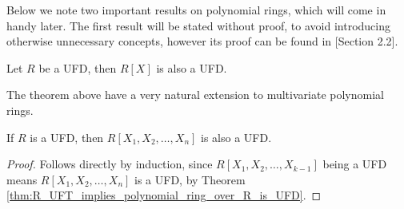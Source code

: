 Below we note two important results on polynomial rings, which will come in handy later. The first result will be stated without proof, to avoid introducing otherwise unnecessary concepts, however its proof can be found in \cite{lang}[Section 2.2].
\begin{theorem}\label{thm:R_UFT_implies_polynomial_ring_over_R_is_UFD}
  Let $R$ be a UFD, then $R[X]$ is also a UFD.
\end{theorem}

The theorem above have a very natural extension to multivariate polynomial rings.
\begin{corollary}\label{cor:multivariate_polynomial_ring_is_UFD}
  If $R$ is a UFD, then $R[X_1, X_2, \ldots, X_{n}]$ is also a UFD.
\end{corollary}

\begin{proof}
  Follows directly by induction, since $R[X_1, X_2, \ldots, X_{k - 1}]$ being a UFD means $R[X_1, X_2, \ldots, X_{n}]$ is a UFD, by Theorem \ref{thm:R_UFT_implies_polynomial_ring_over_R_is_UFD}.
\end{proof}
